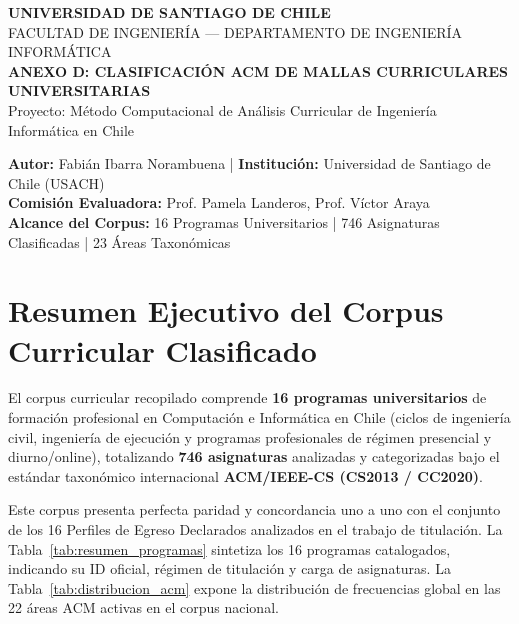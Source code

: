 \documentclass[11pt,a4paper]{article}
\begin{document}
\begin{center}
    {\Large\bfseries\sffamily\color{UsachNavy} UNIVERSIDAD DE SANTIAGO DE CHILE}\\[2pt]
    {\small\sffamily\color{DarkGray} FACULTAD DE INGENIERÍA --- DEPARTAMENTO DE INGENIERÍA INFORMÁTICA}\\[12pt]
    
    {\Large\bfseries\sffamily\color{UsachOrange} ANEXO D: CLASIFICACIÓN ACM DE MALLAS CURRICULARES UNIVERSITARIAS}\\[4pt]
    {\large\sffamily\color{UsachNavy} Proyecto: Método Computacional de Análisis Curricular de Ingeniería Informática en Chile}\\[10pt]
    
    \begin{tcolorbox}[colback=UsachNavy!5,colframe=UsachNavy,arc=3pt,boxrule=0.5pt]
        \centering\small\sffamily
        \textbf{Autor:} Fabián Ibarra Norambuena \quad|\quad 
        \textbf{Institución:} Universidad de Santiago de Chile (USACH)\\[2pt]
        \textbf{Comisión Evaluadora:} Prof. Pamela Landeros, Prof. Víctor Araya\\[2pt]
        \textbf{Alcance del Corpus:} 16 Programas Universitarios | 746 Asignaturas Clasificadas | 23 Áreas Taxonómicas
    \end{tcolorbox}
\end{center}

\vspace{5pt}

\section{\texorpdfstring{\sffamily\color{UsachNavy} Resumen Ejecutivo del Corpus Curricular Clasificado}{Resumen Ejecutivo del Corpus Curricular Clasificado}}

El corpus curricular recopilado comprende \textbf{16 programas universitarios} de formación profesional en Computación e Informática en Chile (ciclos de ingeniería civil, ingeniería de ejecución y programas profesionales de régimen presencial y diurno/online), totalizando \textbf{746 asignaturas} analizadas y categorizadas bajo el estándar taxonómico internacional \textbf{ACM/IEEE-CS (CS2013 / CC2020)}.

Este corpus presenta perfecta paridad y concordancia uno a uno con el conjunto de los 16 Perfiles de Egreso Declarados analizados en el trabajo de titulación. La Tabla~\ref{tab:resumen_programas} sintetiza los 16 programas catalogados, indicando su ID oficial, régimen de titulación y carga de asignaturas. La Tabla~\ref{tab:distribucion_acm} expone la distribución de frecuencias global en las 22 áreas ACM activas en el corpus nacional.
\end{document}
